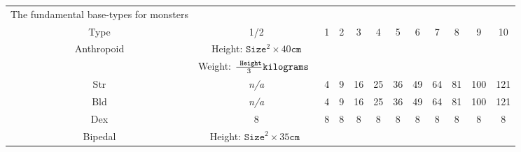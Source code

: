 \documentclass[twoside]{book}
\begin{document}
\begin{table}[htb]
  \begin{center}

  \begin{tabular}{|c|c|c|c|c|c|c|c|c|c|c|c|}
  \hline
    
  \textscbf{}&
  \textscbf{}&
  \textscbf{}&
  \textscbf{}&
  \textscbf{}&
  \textscbf{}&
  \textscbf{}&
  \textscbf{}&
  \textscbf{}&
  \textscbf{}&
  \textscbf{}&
  \textscbf{}\\
  \hline
  \hline
      
                    The fundamental base-types for monsters
                  \\

\hline

 Type & 1/2 & 1 & 2 & 3 & 4 & 5 & 6 & 7 & 8 & 9 & 10 \\

\hline

 Anthropoid &  Height: \begin{math}    
                        {\texttt{Size}}^{ 2 }   \times     40 \texttt{
                           cm}    \end{math}
                  \\

\hline

&  Weight: \begin{math}    {{\texttt{
                     Height}}\over{ 3 }}  \texttt{kilograms
                    }    \end{math}
                  \\

\hline

 Str &
                    \textit{n/a}
                  & 4 & 9 & 16 & 25 & 36 & 49 & 64 & 81 & 100 & 121 \\

\hline

 Bld &
                    \textit{n/a}
                  & 4 & 9 & 16 & 25 & 36 & 49 & 64 & 81 & 100 & 121 \\

\hline

 Dex & 8 & 8 & 8 & 8 & 8 & 8 & 8 & 8 & 8 & 8 & 8 \\

\hline

 Bipedal &  Height: \begin{math}    
                        {\texttt{Size}}^{ 2 }   \times   35 \texttt{cm
                          }    \end{math}
                  \\


\end{tabular}
\end{center}
\end{table}
\end{document}
